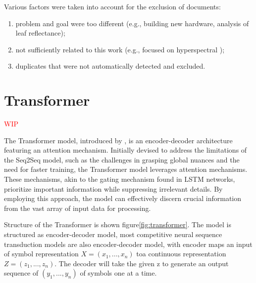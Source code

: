 Various factors were taken into account for the exclusion of documents:
\begin{enumerate}
    \item problem and goal were too different (e.g., building new hardware, analysis of leaf reflectance);
    \item not sufficiently related to this work (e.g., focused on hyperspectral );
    \item duplicates that were not automatically detected and excluded.
\end{enumerate}




\section{Transformer}
\textcolor{red}{WIP}

The Transformer model, introduced by \cite{vaswani2023attention}, is an encoder-decoder architecture featuring an attention mechanism. Initially devised to address the limitations of the Seq2Seq model, such as the challenges in grasping global nuances and the need for faster training, the Transformer model leverages attention mechanisms. These mechanisms, akin to the gating mechanism found in LSTM networks, prioritize important information while suppressing irrelevant details. By employing this approach, the model can effectively discern crucial information from the vast array of input data for processing.

Structure of the Transformer is shown figure\ref{fig:transformer}. The model is structured as encoder-decoder model, most competitive neural sequence transduction models are also encoder-decoder model, with encoder maps an input of symbol representation $X=(x_1, ...,x_n)$ toa continuous representation $Z=(z_1,...,z_n)$. The decoder will take the given z to generate an output sequence of $(y_1,...,y_n)$ of symbols one at a time.

